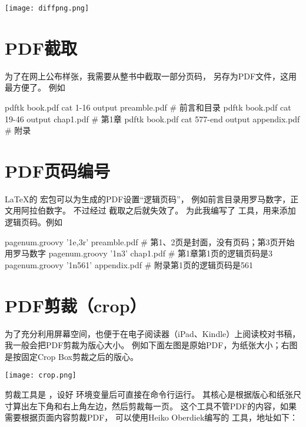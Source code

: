 \vspace{1ex}
\centerline{\texttt{[image: diffpng.png]}}

\section{PDF截取}
为了在网上公布样张，我需要从整书中截取一部分页码，
另存为PDF文件，这用  最方便了。
例如

\begin{Code}
pdftk book.pdf cat 1-16 output preamble.pdf     # 前言和目录
pdftk book.pdf cat 19-46 output chap1.pdf       # 第1章
pdftk book.pdf cat 577-end output appendix.pdf  # 附录
\end{Code}


\section{PDF页码编号}

\LaTeX 的  宏包可以为生成的PDF设置“逻辑页码”，
例如前言目录用罗马数字，正文用阿拉伯数字。
不过经过  截取之后就失效了。
为此我编写了  工具，用来添加逻辑页码。例如

\begin{Code}
pagenum.groovy '1e,3r' preamble.pdf  # 第1、2页是封面，没有页码；第3页开始用罗马数字
pagenum.groovy '1n3'   chap1.pdf     # 第1章第1页的逻辑页码是3
pagenum.groovy '1n561' appendix.pdf  # 附录第1页的逻辑页码是561
\end{Code}


\section{PDF剪裁（crop）}
\label{sec:pdfcrop}
为了充分利用屏幕空间，也便于在电子阅读器（iPad、Kindle）上阅读校对书稿，
我一般会把PDF剪裁为版心大小。
例如下面左图是原始PDF，为纸张大小；右图是按固定Crop Box剪裁之后的版心。

\vspace{1ex}
\centerline{\texttt{[image: crop.png]}}

剪裁工具是 ，设好  环境变量后可直接在命令行运行。
其核心是根据版心和纸张尺寸算出左下角和右上角左边，然后剪裁每一页。
这个工具不管PDF的内容，如果需要根据页面内容剪裁PDF，
可以使用Heiko Oberdiek编写的  工具，地址如下：

